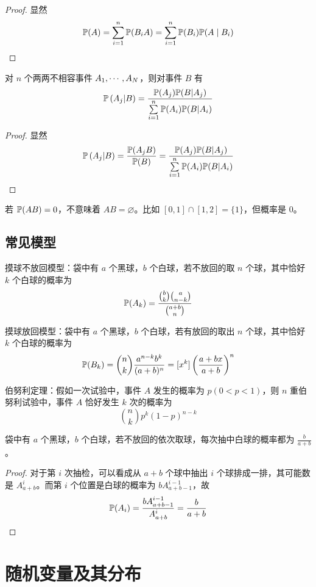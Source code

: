 \begin{proof}
	显然
	\[ \mathbb{P}(A) = \sum_{i=1}^n \mathbb{P}(B_i A) = \sum_{i=1}^n \mathbb{P}(B_i)\mathbb{P}(A \mid B_i) \]
\end{proof}


\begin{theorem}[贝叶斯公式]
	对 $n$ 个两两不相容事件 $A_1,\cdots,A_N$，则对事件 $B$ 有
	\[ \mathbb{P}\left(A_j | B\right) = \frac{\mathbb{P}(A_j)\mathbb{P}(B | A_j)}{\sum\limits_{i=1}^n \mathbb{P}(A_i)\mathbb{P}(B | A_i) } \]
\end{theorem}

\begin{proof}
	显然
	\[ \mathbb{P}\left(A_j | B\right) = \frac{\mathbb{P}(A_j B)}{\mathbb{P}(B)} = \frac{\mathbb{P}(A_j)\mathbb{P}(B | A_j)}{\sum\limits_{i=1}^n \mathbb{P}(A_i)\mathbb{P}(B | A_i) } \]
\end{proof}

\begin{note}
	若 $\mathbb{P}(AB) = 0$，不意味着 $AB = \varnothing$。比如 $[0,1]\cap [1,2] = \{1\}$，但概率是 $0$。
\end{note}

\subsection{常见模型}

摸球不放回模型：袋中有 $a$ 个黑球，$b$ 个白球，若不放回的取 $n$ 个球，其中恰好 $k$ 个白球的概率为
\[ \mathbb{P}(A_k) = \frac{\binom{b}{k} \binom{a}{n-k}}{\binom{a+b}{n}} \]

摸球放回模型：袋中有 $a$ 个黑球，$b$ 个白球，若有放回的取出 $n$ 个球，其中恰好 $k$ 个白球的概率为
\[ \mathbb{P}(B_k) = \binom{n}{k} \frac{a^{n-k} b^k}{(a+b)^n} = [x^k] \left(\frac{a + bx}{a+b}\right)^n \]

伯努利定理：假如一次试验中，事件 $A$ 发生的概率为 $p(0 < p < 1)$，则 $n$ 重伯努利试验中，事件 $A$ 恰好发生 $k$ 次的概率为
\[ \binom{n}{k} p^k (1 - p)^{n-k} \]

\begin{theorem}[抽签原理]
	袋中有 $a$ 个黑球，$b$ 个白球，若不放回的依次取球，每次抽中白球的概率都为 $\frac{b}{a+b}$。
\end{theorem}

\begin{proof}
	对于第 $i$ 次抽检，可以看成从 $a+b$ 个球中抽出 $i$ 个球排成一排，其可能数是 $A_{a+b}^i$。而第 $i$ 个位置是白球的概率为 $b A_{a+b-1}^{i-1}$，故
	\[ \mathbb{P}(A_i) = \frac{b A_{a+b-1}^{i-1}}{A_{a+b}^i} = \frac{b}{a+b} \]
\end{proof}

\section{随机变量及其分布}

